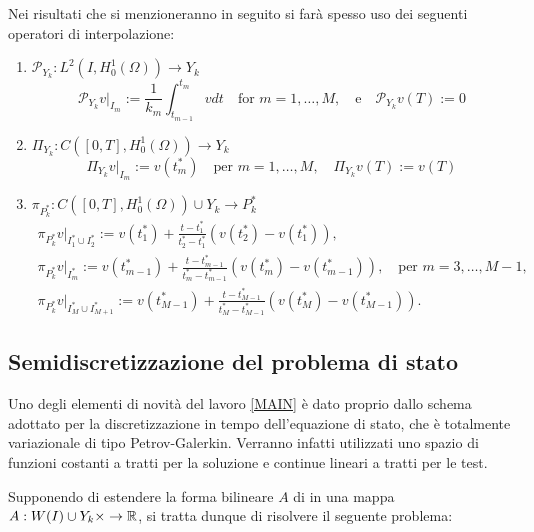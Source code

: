 Nei risultati che si menzioneranno in seguito si farà spesso uso dei seguenti operatori di interpolazione:
\begin{enumerate}
\item $\mathcal{P}_{Y_{k}}:L^2(I,H^1_0(\Omega))\to Y_k$
\[
\mathcal{P}_{Y_{k}} v|_{I_{m}}:=\frac{1}{k_{m}} \int^{t_{m}}_{t_{m-1}}vdt\quad \text{for $m=1,\dots,M$},\quad\text{e}\quad \mathcal{P}_{Y_{k}}v(T):=0
\]
\item $\Pi_{Y_{k}}:C([0,T],H^1_0(\Omega))\to Y_k$
\[
\Pi_{Y_{k}} v|_{I_{m}}:=v(t^*_m)\quad\text{per $m=1,\dots,M$},\quad \Pi_{Y_{k}} v(T):=v(T)
\]
\item $\pi_{P^*_k}:C([0,T],H^1_0(\Omega))\cup Y_k\to P^*_k$
\begin{gather*}
\pi_{P^*_k} v|_{I^*_1\cup I^*_2}:=v(t^*_1)+\frac{t-t^*_1}{t^*_2-t^*_1}(v(t^*_2)-v(t^*_1)),\\
\pi_{P^*_k} v|_{I^*_m}:=v(t^*_{m-1})+\frac{t-t^*_{m-1}}{t^*_{m}-t^*_{m-1}}(v(t^*_m)-v(t^*_{m-1})),\quad\text{per $m=3,\dots,M-1$},\\
\pi_{P^*_k} v|_{I^*_M\cup I^*_{M+1}}:=v(t^*_{M-1})+\frac{t-t^*_{M-1}}{t^*_M-t^*_{M-1}}(v(t^*_M)-v(t^*_{M-1})).
\end{gather*}
\end{enumerate} 


\subsection{Semidiscretizzazione del problema di stato}
Uno degli elementi di novità del lavoro \ref{MAIN} è dato proprio dallo schema adottato per la discretizzazione in tempo dell'equazione di stato, che è totalmente variazionale di tipo Petrov-Galerkin. Verranno infatti utilizzati uno spazio di funzioni costanti a tratti per la soluzione e continue lineari a tratti per le test. 

Supponendo di estendere la forma bilineare $A$ di \cite{MAIN} in una mappa $A:W(I)\cup Y_k\times\to\mathbb{R}$, si tratta dunque di risolvere il seguente problema:

